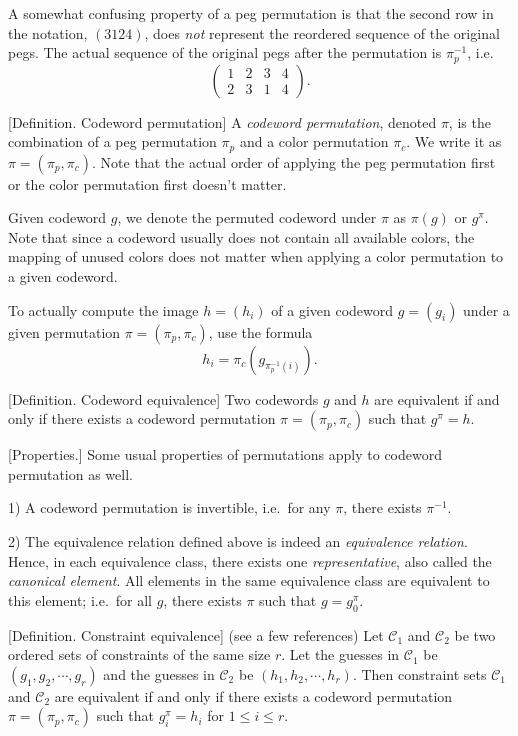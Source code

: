 A somewhat confusing property of a peg permutation is that the second row in the notation, $(3 1 2 4)$, does \emph{not} represent the reordered sequence of the original pegs. The actual sequence of the original pegs after the permutation is $\pi_p^{-1}$, i.e.
\[
\begin{pmatrix}
1 & 2 & 3 & 4 \\
2 & 3 & 1 & 4
\end{pmatrix} .
\]

[Definition. Codeword permutation] A \emph{codeword permutation}, denoted $\pi$, is the combination of a peg permutation $\pi_p$ and a color permutation $\pi_c$. We write it as $\pi=(\pi_p,\pi_c)$. Note that the actual order of applying the peg permutation first or the color permutation first doesn't matter.

Given codeword $g$, we denote the permuted codeword under $\pi$ as $\pi(g)$ or $g^\pi$. Note that since a codeword usually does not contain all available colors, the mapping of unused colors does not matter when applying a color permutation to a given codeword.

To actually compute the image $h = (h_i)$ of a given codeword $g = (g_i)$ under a given permutation $\pi = (\pi_p, \pi_c)$, use the formula
\[
h_i = \pi_c\left(g_{\pi_p^{-1}(i)}\right) .
\]

[Definition. Codeword equivalence] Two codewords $g$ and $h$ are equivalent if and only if there exists a codeword permutation $\pi=(\pi_p,\pi_c)$ such that $g^\pi = h$.

[Properties.] Some usual properties of permutations apply to codeword permutation as well.

1) A codeword permutation is invertible, i.e.\ for any $\pi$, there exists $\pi^{-1}$.

2) The equivalence relation defined above is indeed an \emph{equivalence relation}. Hence, in each equivalence class, there exists one \emph{representative}, also called the \emph{canonical element}. All elements in the same equivalence class are equivalent to this element; i.e.\ for all $g$, there exists $\pi$ such that $g = g_0^\pi$.

[Definition. Constraint equivalence] (see a few references) Let $\mathcal{C}_1$ and $\mathcal{C}_2$ be two ordered sets of constraints of the same size $r$. Let the guesses in $\mathcal{C}_1$ be $(g_1,g_2,\cdots,g_r)$ and the guesses in $\mathcal{C}_2$ be $(h_1,h_2,\cdots,h_r)$. Then constraint sets $\mathcal{C}_1$ and $\mathcal{C}_2$ are equivalent if and only if there exists a codeword permutation $\pi=(\pi_p,\pi_c)$ such that
$g_i^\pi = h_i$ for $1 \le i \le r$.

